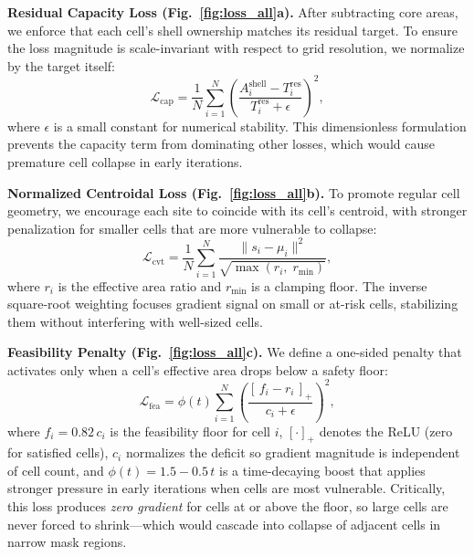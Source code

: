 \vspace{1mm}
\noindent\textbf{Residual Capacity Loss (Fig.~\ref{fig:loss_all}a).}
After subtracting core areas, we enforce that each cell's shell ownership matches its residual target. To ensure the loss magnitude is scale-invariant with respect to grid resolution, we normalize by the target itself:
\begin{equation}
\mathcal{L}_{\text{cap}} = \frac{1}{N}\sum_{i=1}^{N}
\left(\frac{A_i^{\text{shell}} - T_i^{\text{res}}}{T_i^{\text{res}} + \epsilon}\right)^{\!2},
\end{equation}
where $\epsilon$ is a small constant for numerical stability. This dimensionless formulation prevents the capacity term from dominating other losses, which would cause premature cell collapse in early iterations.

\vspace{1mm}
\noindent\textbf{Normalized Centroidal Loss (Fig.~\ref{fig:loss_all}b).}
To promote regular cell geometry, we encourage each site to coincide with its cell's centroid, with stronger penalization for smaller cells that are more vulnerable to collapse:
\begin{equation}
\mathcal{L}_{\text{cvt}} = \frac{1}{N}\sum_{i=1}^{N}
\frac{\|s_i - \mu_i\|^2}{\sqrt{\max(r_i,\; r_{\min})}},
\end{equation}
where $r_i$ is the effective area ratio and $r_{\min}$ is a clamping floor. The inverse square-root weighting focuses gradient signal on small or at-risk cells, stabilizing them without interfering with well-sized cells.

\vspace{1mm}
\noindent\textbf{Feasibility Penalty (Fig.~\ref{fig:loss_all}c).}
We define a one-sided penalty that activates only when a cell's effective area drops below a safety floor:
\begin{equation}
\mathcal{L}_{\text{fea}} = \phi(t) \sum_{i=1}^{N}
\left(\frac{[\,f_i - r_i\,]_+}{c_i + \epsilon}\right)^{\!2},
\end{equation}
where $f_i = 0.82\,c_i$ is the feasibility floor for cell $i$, $[\cdot]_+$ denotes the ReLU (zero for satisfied cells), $c_i$ normalizes the deficit so gradient magnitude is independent of cell count, and $\phi(t) = 1.5 - 0.5\,t$ is a time-decaying boost that applies stronger pressure in early iterations when cells are most vulnerable. Critically, this loss produces \emph{zero gradient} for cells at or above the floor, so large cells are never forced to shrink---which would cascade into collapse of adjacent cells in narrow mask regions.


